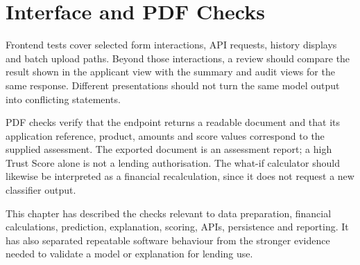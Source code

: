 \section{Interface and PDF Checks}
Frontend tests cover selected form interactions, API requests, history displays and batch upload paths. Beyond those interactions, a review should compare the result shown in the applicant view with the summary and audit views for the same response. Different presentations should not turn the same model output into conflicting statements.

PDF checks verify that the endpoint returns a readable document and that its application reference, product, amounts and score values correspond to the supplied assessment. The exported document is an assessment report; a high Trust Score alone is not a lending authorisation. The what-if calculator should likewise be interpreted as a financial recalculation, since it does not request a new classifier output.

\par\medskip\noindent
This chapter has described the checks relevant to data preparation, financial calculations, prediction, explanation, scoring, APIs, persistence and reporting. It has also separated repeatable software behaviour from the stronger evidence needed to validate a model or explanation for lending use.
